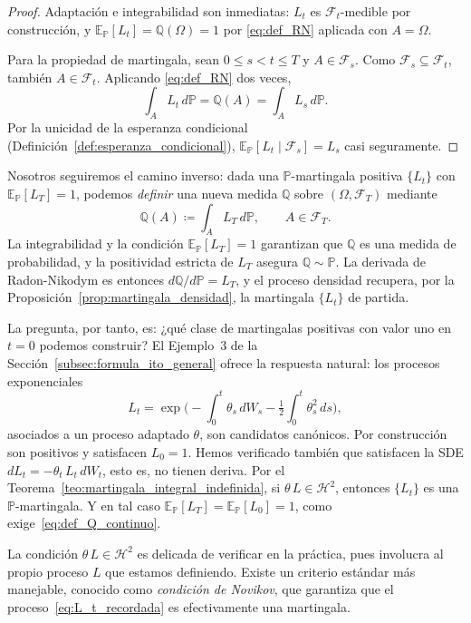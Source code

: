 \documentclass[11pt,a4paper,oneside]{report}
\theoremstyle{plain}
\theoremstyle{definition}
\theoremstyle{remark}
\newcommand{\E}{\mathbb{E}}
\newcommand{\PP}{\mathbb{P}}
\newcommand{\Q}{\mathbb{Q}}
\newcommand{\F}{\mathcal{F}}
\newcommand{\1}{\mathbf{1}}
\newcommand{\eqdef}{\coloneqq}
\begin{document}
\begin{proof}
Adaptación e integrabilidad son inmediatas: $L_t$ es $\F_t$-medible
por construcción, y $\E_\PP[L_t] = \Q(\Omega) = 1$ por
\eqref{eq:def_RN} aplicada con $A = \Omega$.

Para la propiedad de martingala, sean $0 \leq s < t \leq T$ y $A \in
\F_s$. Como $\F_s \subseteq \F_t$, también $A \in \F_t$. Aplicando
\eqref{eq:def_RN} dos veces,
\begin{equation*}
  \int_A L_t\, d\PP = \Q(A) = \int_A L_s\, d\PP.
\end{equation*}
Por la unicidad de la esperanza condicional
(Definición~\ref{def:esperanza_condicional}), $\E_\PP[L_t \mid \F_s] =
L_s$ casi seguramente.
\end{proof}

Nosotros seguiremos el camino inverso: dada una
$\PP$-martingala positiva $\{L_t\}$ con $\E_\PP[L_T] = 1$, podemos
\emph{definir} una nueva medida $\Q$ sobre $(\Omega, \F_T)$ mediante
\begin{equation}\label{eq:def_Q_continuo}
  \Q(A) \eqdef \int_A L_T\, d\PP, \qquad A \in \F_T.
\end{equation}
La integrabilidad y la condición $\E_\PP[L_T] = 1$ garantizan que $\Q$
es una medida de probabilidad, y la positividad estricta de
$L_T$ asegura $\Q \sim \PP$. La derivada de Radon-Nikodym es entonces
$d\Q/d\PP = L_T$, y el proceso densidad recupera, por la
Proposición~\ref{prop:martingala_densidad}, la martingala $\{L_t\}$ de
partida.

La pregunta, por tanto, es: ¿qué clase de martingalas
positivas con valor uno en $t = 0$ podemos construir? El
Ejemplo~3 de la Sección~\ref{subsec:formula_ito_general} ofrece la
respuesta natural: los procesos exponenciales
\begin{equation}\label{eq:L_t_recordada}
  L_t = \exp\!\biggl(-\int_0^t \theta_s\, dW_s
                      - \tfrac{1}{2} \int_0^t \theta_s^2\, ds\biggr),
\end{equation}
asociados a un proceso adaptado $\theta$, son candidatos canónicos. Por
construcción son positivos y satisfacen $L_0 = 1$. Hemos verificado
también que satisfacen la SDE $dL_t = -\theta_t\, L_t\, dW_t$, esto es,
no tienen deriva. Por el Teorema~\ref{teo:martingala_integral_indefinida},
si $\theta\, L \in \mathcal{H}^2$, entonces $\{L_t\}$ es una
$\PP$-martingala. Y en tal caso $\E_\PP[L_T] = \E_\PP[L_0] = 1$, como
exige~\eqref{eq:def_Q_continuo}.

La condición $\theta\, L \in
\mathcal{H}^2$ es delicada de verificar en la práctica, pues involucra
al propio proceso $L$ que estamos definiendo. Existe un criterio
estándar más manejable, conocido como \emph{condición de Novikov},
que garantiza que el proceso~\eqref{eq:L_t_recordada} es efectivamente
una martingala.
\end{document}
